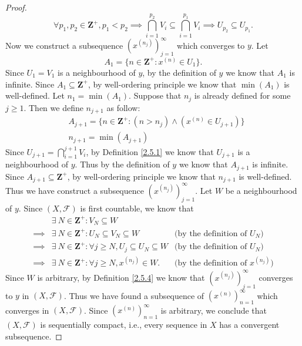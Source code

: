 \begin{proof}
    \[
        \forall p_1, p_2 \in \mathbf{Z}^+, p_1 < p_2 \implies \bigcap_{i = 1}^{p_2} V_i \subseteq \bigcap_{i = 1}^{p_1} V_i \implies U_{p_2} \subseteq U_{p_1}.
    \]
    Now we construct a subsequence \((x^{(n_j)})_{j = 1}^\infty\) which converges to \(y\).
    Let
    \[
        A_1 = \{n \in \mathbf{Z}^+ : x^{(n)} \in U_1\}.
    \]
    Since \(U_1 = V_1\) is a neighbourhood of \(y\), by the definition of \(y\) we know that \(A_1\) is infinite.
    Since \(A_1 \subseteq \mathbf{Z}^+\), by well-ordering principle we know that \(\min(A_1)\) is well-defined.
    Let \(n_1 = \min(A_1)\).
    Suppose that \(n_j\) is already defined for some \(j \geq 1\).
    Then we define \(n_{j + 1}\) as follow:
    \begin{align*}
         & A_{j + 1} = \{n \in \mathbf{Z}^+ : (n > n_j) \land (x^{(n)} \in U_{j + 1})\} \\
         & n_{j + 1} = \min(A_{j + 1})
    \end{align*}
    Since \(U_{j + 1} = \bigcap_{i = 1}^{j + 1} V_i\), by Definition \ref{2.5.1} we know that \(U_{j + 1}\) is a neighbourhood of \(y\).
    Thus by the definition of \(y\) we know that \(A_{j + 1}\) is infinite.
    Since \(A_{j + 1} \subseteq \mathbf{Z}^+\), by well-ordering principle we know that \(n_{j + 1}\) is well-defined.
    Thus we have construct a subsequence \((x^{(n_j)})_{j = 1}^\infty\).
    Let \(W\) be a neighbourhood of \(y\).
    Since \((X, \mathcal{F})\) is first countable, we know that
    \begin{align*}
                 & \exists\ N \in \mathbf{Z}^+ : V_N \subseteq W                                                                               \\
        \implies & \exists\ N \in \mathbf{Z}^+ : U_N \subseteq V_N \subseteq W                   & \text{(by the definition of \(U_N\))}       \\
        \implies & \exists\ N \in \mathbf{Z}^+ : \forall j \geq N, U_j \subseteq U_N \subseteq W & \text{(by the definition of \(U_N\))}       \\
        \implies & \exists\ N \in \mathbf{Z}^+ : \forall j \geq N, x^{(n_j)} \in W.              & \text{(by the definition of \(x^{(n_j)}\))}
    \end{align*}
    Since \(W\) is arbitrary, by Definition \ref{2.5.4} we know that \((x^{(n_j)})_{j = 1}^\infty\) converges to \(y\) in \((X, \mathcal{F})\).
    Thus we have found a subsequence of \((x^{(n)})_{n = 1}^\infty\) which converges in \((X, \mathcal{F})\).
    Since \((x^{(n)})_{n = 1}^\infty\) is arbitrary, we conclude that \((X, \mathcal{F})\) is sequentially compact, i.e., every sequence in \(X\) has a convergent subsequence.
\end{proof}

